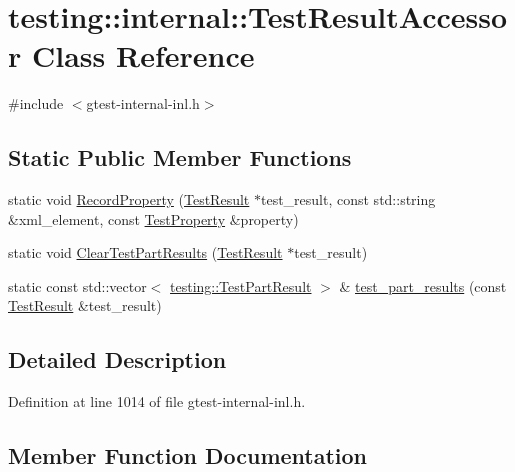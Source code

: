 \hypertarget{classtesting_1_1internal_1_1_test_result_accessor}{}\section{testing\+:\+:internal\+:\+:Test\+Result\+Accessor Class Reference}
\label{classtesting_1_1internal_1_1_test_result_accessor}


{\ttfamily \#include $<$gtest-\/internal-\/inl.\+h$>$}

\subsection*{Static Public Member Functions}
\begin{DoxyCompactItemize}
\item 
static void \hyperlink{classtesting_1_1internal_1_1_test_result_accessor_abcc4b32d1b201eeef92f0ec0ae161cf9}{Record\+Property} (\hyperlink{classtesting_1_1_test_result}{Test\+Result} $\ast$test\+\_\+result, const std\+::string \&xml\+\_\+element, const \hyperlink{classtesting_1_1_test_property}{Test\+Property} \&property)
\item 
static void \hyperlink{classtesting_1_1internal_1_1_test_result_accessor_a53c626632bac65d82d88e432072b866b}{Clear\+Test\+Part\+Results} (\hyperlink{classtesting_1_1_test_result}{Test\+Result} $\ast$test\+\_\+result)
\item 
static const std\+::vector$<$ \hyperlink{classtesting_1_1_test_part_result}{testing\+::\+Test\+Part\+Result} $>$ \& \hyperlink{classtesting_1_1internal_1_1_test_result_accessor_a55d771904317c1b0cc380104d175f1db}{test\+\_\+part\+\_\+results} (const \hyperlink{classtesting_1_1_test_result}{Test\+Result} \&test\+\_\+result)
\end{DoxyCompactItemize}


\subsection{Detailed Description}


Definition at line 1014 of file gtest-\/internal-\/inl.\+h.



\subsection{Member Function Documentation}
